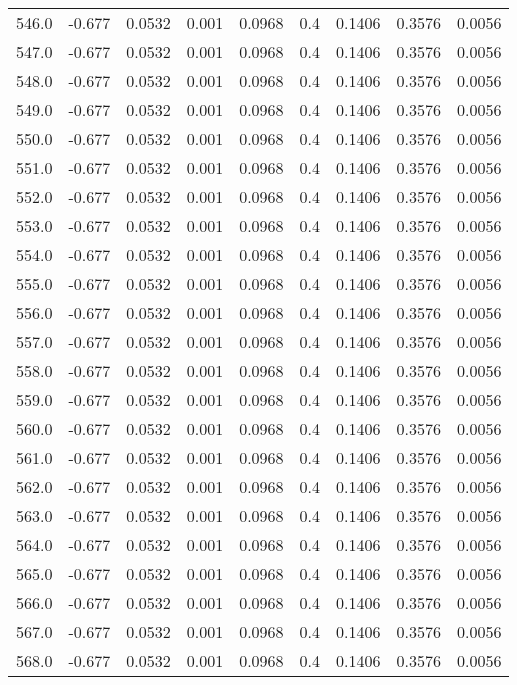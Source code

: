 \begin{longtable}{lrrrrrrrr}
546.0 & -0.677 & 0.0532 & 0.001 & 0.0968 & 0.4 & 0.1406 & 0.3576 & 0.0056 \\
547.0 & -0.677 & 0.0532 & 0.001 & 0.0968 & 0.4 & 0.1406 & 0.3576 & 0.0056 \\
548.0 & -0.677 & 0.0532 & 0.001 & 0.0968 & 0.4 & 0.1406 & 0.3576 & 0.0056 \\
549.0 & -0.677 & 0.0532 & 0.001 & 0.0968 & 0.4 & 0.1406 & 0.3576 & 0.0056 \\
550.0 & -0.677 & 0.0532 & 0.001 & 0.0968 & 0.4 & 0.1406 & 0.3576 & 0.0056 \\
551.0 & -0.677 & 0.0532 & 0.001 & 0.0968 & 0.4 & 0.1406 & 0.3576 & 0.0056 \\
552.0 & -0.677 & 0.0532 & 0.001 & 0.0968 & 0.4 & 0.1406 & 0.3576 & 0.0056 \\
553.0 & -0.677 & 0.0532 & 0.001 & 0.0968 & 0.4 & 0.1406 & 0.3576 & 0.0056 \\
554.0 & -0.677 & 0.0532 & 0.001 & 0.0968 & 0.4 & 0.1406 & 0.3576 & 0.0056 \\
555.0 & -0.677 & 0.0532 & 0.001 & 0.0968 & 0.4 & 0.1406 & 0.3576 & 0.0056 \\
556.0 & -0.677 & 0.0532 & 0.001 & 0.0968 & 0.4 & 0.1406 & 0.3576 & 0.0056 \\
557.0 & -0.677 & 0.0532 & 0.001 & 0.0968 & 0.4 & 0.1406 & 0.3576 & 0.0056 \\
558.0 & -0.677 & 0.0532 & 0.001 & 0.0968 & 0.4 & 0.1406 & 0.3576 & 0.0056 \\
559.0 & -0.677 & 0.0532 & 0.001 & 0.0968 & 0.4 & 0.1406 & 0.3576 & 0.0056 \\
560.0 & -0.677 & 0.0532 & 0.001 & 0.0968 & 0.4 & 0.1406 & 0.3576 & 0.0056 \\
561.0 & -0.677 & 0.0532 & 0.001 & 0.0968 & 0.4 & 0.1406 & 0.3576 & 0.0056 \\
562.0 & -0.677 & 0.0532 & 0.001 & 0.0968 & 0.4 & 0.1406 & 0.3576 & 0.0056 \\
563.0 & -0.677 & 0.0532 & 0.001 & 0.0968 & 0.4 & 0.1406 & 0.3576 & 0.0056 \\
564.0 & -0.677 & 0.0532 & 0.001 & 0.0968 & 0.4 & 0.1406 & 0.3576 & 0.0056 \\
565.0 & -0.677 & 0.0532 & 0.001 & 0.0968 & 0.4 & 0.1406 & 0.3576 & 0.0056 \\
566.0 & -0.677 & 0.0532 & 0.001 & 0.0968 & 0.4 & 0.1406 & 0.3576 & 0.0056 \\
567.0 & -0.677 & 0.0532 & 0.001 & 0.0968 & 0.4 & 0.1406 & 0.3576 & 0.0056 \\
568.0 & -0.677 & 0.0532 & 0.001 & 0.0968 & 0.4 & 0.1406 & 0.3576 & 0.0056 \\

\end{longtable}
